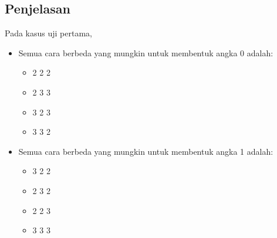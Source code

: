 \documentclass{article}
\begin{document}
\pagebreak
\subsection*{Penjelasan}
Pada kasus uji pertama,
\begin{itemize}
    \item Semua cara berbeda yang mungkin untuk membentuk angka 0 adalah:
    \begin{itemize}
        \item 2 2 2
        \item 2 3 3
        \item 3 2 3
        \item 3 3 2
    \end{itemize}
    
    \item Semua cara berbeda yang mungkin untuk membentuk angka 1 adalah:
    \begin{itemize}
        \item 3 2 2
        \item 2 3 2
        \item 2 2 3
        \item 3 3 3
    \end{itemize}
\end{itemize}
\end{document}
